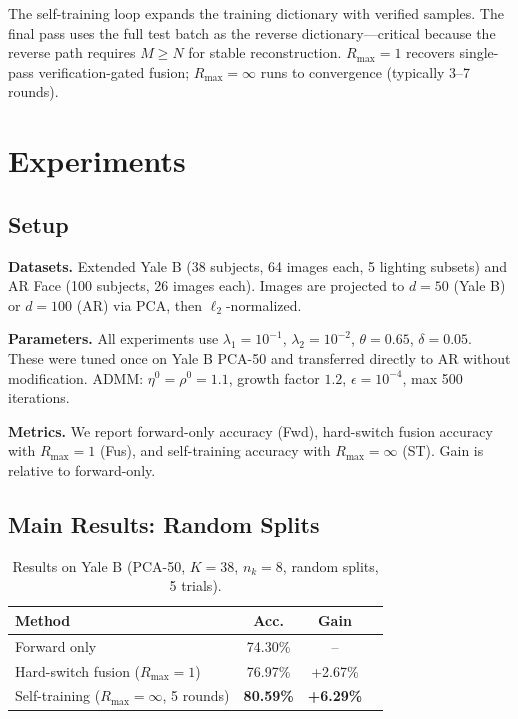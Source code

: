 \documentclass[10pt,comsoc]{IEEEtran}
\begin{document}
The self-training loop expands the training dictionary with verified samples. The final pass uses the full test batch as the reverse dictionary---critical because the reverse path requires $M \geq N$ for stable reconstruction. $R_{\max}=1$ recovers single-pass verification-gated fusion; $R_{\max}=\infty$ runs to convergence (typically 3--7 rounds).

\section{Experiments}

\subsection{Setup}

\textbf{Datasets.} Extended Yale B \cite{georghiades2001from} (38 subjects, 64 images each, 5 lighting subsets) and AR Face \cite{martinez1998ar} (100 subjects, 26 images each). Images are projected to $d=50$ (Yale B) or $d=100$ (AR) via PCA, then $\ell_2$-normalized.

\textbf{Parameters.} All experiments use $\lambda_1=10^{-1}$, $\lambda_2=10^{-2}$, $\theta=0.65$, $\delta=0.05$. These were tuned once on Yale B PCA-50 and transferred directly to AR without modification. ADMM: $\eta^0=\rho^0=1.1$, growth factor $1.2$, $\epsilon=10^{-4}$, max 500 iterations.

\textbf{Metrics.} We report forward-only accuracy (Fwd), hard-switch fusion accuracy with $R_{\max}=1$ (Fus), and self-training accuracy with $R_{\max}=\infty$ (ST). Gain is relative to forward-only.

\subsection{Main Results: Random Splits}

\begin{table}[t]
\centering
\caption{Results on Yale B (PCA-50, $K=38$, $n_k=8$, random splits, 5 trials).}
\label{tab:yaleb_main}
\begin{tabular}{lccc}
\hline
\textbf{Method} & \textbf{Acc.} & \textbf{Gain} \\ \hline
Forward only & 74.30\% & -- \\
Hard-switch fusion ($R_{\max}=1$) & 76.97\% & +2.67\% \\
Self-training ($R_{\max}=\infty$, 5 rounds) & \textbf{80.59\%} & \textbf{+6.29\%} \\ \hline
\end{tabular}
\end{table}
\end{document}
